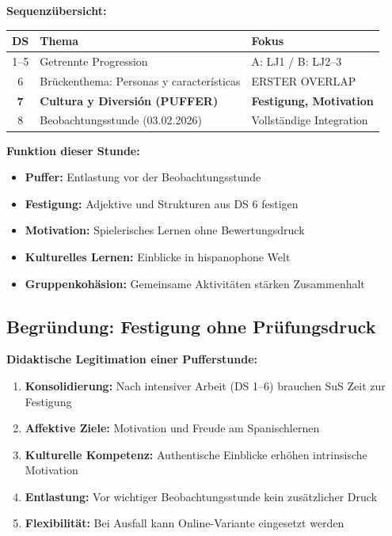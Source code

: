 \documentclass[11pt,a4paper]{article}
\begin{document}
\vspace{0.5em}
\textbf{Sequenzübersicht:}
\begin{center}
\begin{tabular}{|c|l|l|}
\hline
\textbf{DS} & \textbf{Thema} & \textbf{Fokus} \\
\hline
1--5 & Getrennte Progression & A: LJ1 / B: LJ2--3 \\
\hline
6 & Brückenthema: Personas y características & ERSTER OVERLAP \\
\hline
\rowcolor{lightgray} \textbf{7} & \textbf{Cultura y Diversión (PUFFER)} & \textbf{Festigung, Motivation} \\
\hline
8 & Beobachtungsstunde (03.02.2026) & Vollständige Integration \\
\hline
\end{tabular}
\end{center}

\textbf{Funktion dieser Stunde:}
\begin{itemize}
    \item \textbf{Puffer:} Entlastung vor der Beobachtungsstunde
    \item \textbf{Festigung:} Adjektive und Strukturen aus DS 6 festigen
    \item \textbf{Motivation:} Spielerisches Lernen ohne Bewertungsdruck
    \item \textbf{Kulturelles Lernen:} Einblicke in hispanophone Welt
    \item \textbf{Gruppenkohäsion:} Gemeinsame Aktivitäten stärken Zusammenhalt
\end{itemize}

\subsection{Begründung: Festigung ohne Prüfungsdruck}

\textbf{Didaktische Legitimation einer Pufferstunde:}
\begin{enumerate}
    \item \textbf{Konsolidierung:} Nach intensiver Arbeit (DS 1--6) brauchen SuS Zeit zur Festigung
    \item \textbf{Affektive Ziele:} Motivation und Freude am Spanischlernen
    \item \textbf{Kulturelle Kompetenz:} Authentische Einblicke erhöhen intrinsische Motivation
    \item \textbf{Entlastung:} Vor wichtiger Beobachtungsstunde kein zusätzlicher Druck
    \item \textbf{Flexibilität:} Bei Ausfall kann Online-Variante eingesetzt werden
\end{enumerate}
\end{document}
